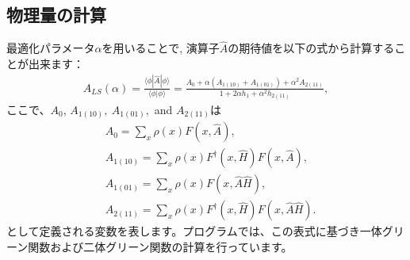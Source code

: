 \subsection{物理量の計算}
最適化パラメータ$\alpha$を用いることで, 演算子$\hat{A}$の期待値を以下の式から計算することが出来ます： 
\begin{align}
A_{LS}(\alpha) =\frac{\langle \phi| \hat{A} |\phi\rangle}{\langle \phi|\phi\rangle}=\frac{A_0 + \alpha(A_{1(10)} + A_{1(01)}) + \alpha^2 A_{2(11)}}{1 + 2\alpha h_1 + \alpha^2 h_{2(11)}},
\end{align}
ここで、$A_0$, $A_{1(10)},~A_{1(01)},$ and $A_{2(11)}$は
\begin{align}
&A_0 =\sum_{x} \rho(x) F(x,  \hat{A}),\\
&A_{1(10)}=\sum_{x} \rho(x) F^{\dag}(x,  \hat{H}) F(x, \hat{A}),\\
&A_{1(01)}=\sum_{x} \rho(x) F(x, \hat{A}\hat{H}),\\
&A_{2(11)}=\sum_{x} \rho(x) F^{\dag}(x,  \hat{H})F(x,  \hat{A}\hat{H}).
\end{align}
として定義される変数を表します。プログラムでは、この表式に基づき一体グリーン関数および二体グリーン関数の計算を行っています。
